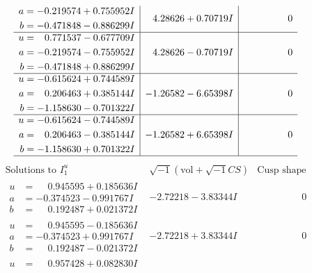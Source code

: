 \documentclass[1p]{elsarticle_modified}
\theoremstyle{definition}
\newcommand{\I}{\sqrt{-1}}
\begin{document}
$$\begin{array}{c|c|c}
\begin{aligned}
a &= -0.219574 + 0.755952 I \\
b &= -0.471848 - 0.886299 I\end{aligned}
 & \phantom{-}4.28626 + 0.70719 I & \phantom{-0.000000 } 0 \\ \hline\begin{aligned}
u &= \phantom{-}0.771537 - 0.677709 I \\
a &= -0.219574 - 0.755952 I \\
b &= -0.471848 + 0.886299 I\end{aligned}
 & \phantom{-}4.28626 - 0.70719 I & \phantom{-0.000000 } 0 \\ \hline\begin{aligned}
u &= -0.615624 + 0.744589 I \\
a &= \phantom{-}0.206463 + 0.385144 I \\
b &= -1.158630 - 0.701322 I\end{aligned}
 & -1.26582 - 6.65398 I & \phantom{-0.000000 } 0 \\ \hline\begin{aligned}
u &= -0.615624 - 0.744589 I \\
a &= \phantom{-}0.206463 - 0.385144 I \\
b &= -1.158630 + 0.701322 I\end{aligned}
 & -1.26582 + 6.65398 I & \phantom{-0.000000 } 0\\
 \hline 
 \end{array}$$\newpage$$\begin{array}{c|c|c}  
\text{Solutions to }I^u_{1}& \I (\text{vol} + \sqrt{-1}CS) & \text{Cusp shape}\\
 \hline 
\begin{aligned}
u &= \phantom{-}0.945595 + 0.185636 I \\
a &= -0.374523 - 0.991767 I \\
b &= \phantom{-}0.192487 + 0.021372 I\end{aligned}
 & -2.72218 - 3.83344 I & \phantom{-0.000000 } 0 \\ \hline\begin{aligned}
u &= \phantom{-}0.945595 - 0.185636 I \\
a &= -0.374523 + 0.991767 I \\
b &= \phantom{-}0.192487 - 0.021372 I\end{aligned}
 & -2.72218 + 3.83344 I & \phantom{-0.000000 } 0 \\ \hline\begin{aligned}
u &= \phantom{-}0.957428 + 0.082830 I \\

\end{aligned}
\end{array}$$
\end{document}
